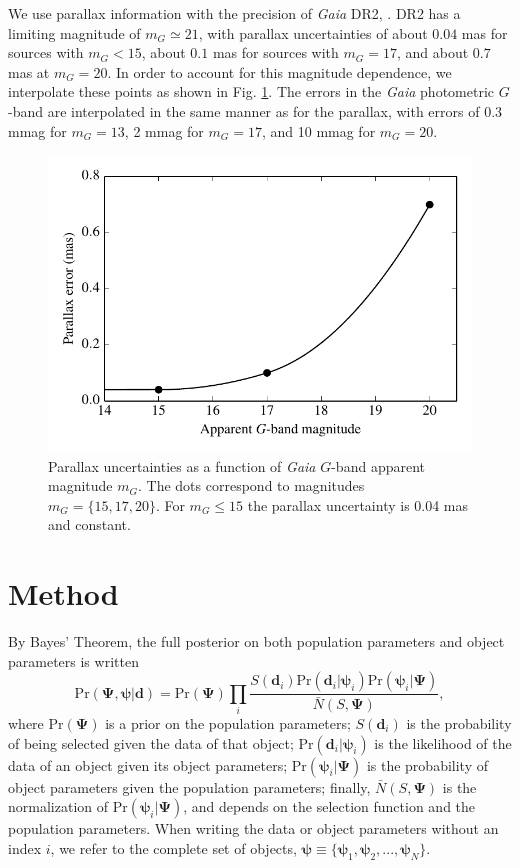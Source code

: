 \documentclass[fleqn,usenatbib]{mnras}
\newcommand{\popp}{\boldsymbol{\Psi}}
\newcommand{\objp}{\boldsymbol{\psi}}
\newcommand{\data}{\mathbf{d}}
\newcommand{\pr}{\text{Pr}}
\begin{document}
We use parallax information with the precision of \emph{Gaia} DR2, \citep{2018arXiv180409366L}. DR2 has a limiting magnitude of $m_G \simeq 21$, with parallax uncertainties of about $0.04$ mas for sources with $m_G<15$, about $0.1$ mas for sources with $m_G=17$, and about $0.7$ mas at $m_G=20$. In order to account for this magnitude dependence, we interpolate these points as shown in Fig. \ref{fig:parallax_error}. The errors in the \emph{Gaia} photometric $G$-band are interpolated in the same manner as for the parallax, with errors of 0.3 mmag for $m_G = 13$, 2 mmag for $m_G = 17$, and 10 mmag for $m_G = 20$.

\begin{figure}
	\includegraphics[width=\columnwidth]{parallax_error.pdf}
    \caption{Parallax uncertainties as a function of \emph{Gaia} $G$-band apparent magnitude $m_G$. The dots correspond to magnitudes $m_G=\{15,17,20\}$. For $m_G\leq 15$ the parallax uncertainty is 0.04 mas and constant.}
    \label{fig:parallax_error}
\end{figure}





\section{Method}\label{sec:method}

By Bayes' Theorem, the full posterior on both population parameters and object parameters is written
\begin{equation}\label{eq:fullposterior}
	\pr(\popp,\objp | \data ) = \pr(\popp)
    \prod_i \frac{S(\data_i) \pr(\data_i|\objp_i) \pr(\objp_i | \popp)}{\bar{N}(S,\popp)},
\end{equation}
where $\pr(\popp)$ is a prior on the population parameters; $S(\data_i)$ is the probability of being selected given the data of that object; $\pr(\data_i|\objp_i)$ is the likelihood of the data of an object given its object parameters; $\pr(\objp_i | \popp)$ is the probability of object parameters given the population parameters; finally, $\bar{N}(S,\popp)$ is the normalization of $\pr(\objp_i | \popp)$, and depends on the selection function and the population parameters. When writing the data or object parameters without an index $i$, we refer to the complete set of objects, $\objp \equiv \{ \objp_1,\objp_2,...,\objp_N \}$.
\end{document}
